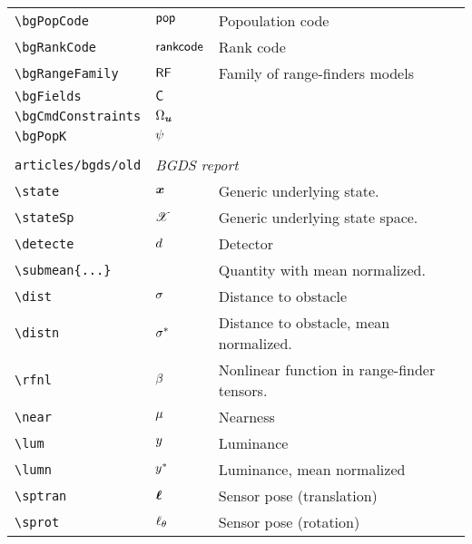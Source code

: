 \begin{longtable}{lll}
 {\color[rgb]{0.5,0.5,0.5}\texttt{\textbackslash bgPopCode}} & $\mathsf{pop}$ &  Popoulation code\\ 
 {\color[rgb]{0.5,0.5,0.5}\texttt{\textbackslash bgRankCode}} & $\mathsf{rankcode}$ &  Rank code\\ 
 {\color[rgb]{0.5,0.5,0.5}\texttt{\textbackslash bgRangeFamily}} & $\mathsf{RF}$ &  Family of range-finders models\\ 
 {\color[rgb]{0.5,0.5,0.5}\texttt{\textbackslash bgFields}} & ${\mathsf{C}}$ & \\ 
 {\color[rgb]{0.5,0.5,0.5}\texttt{\textbackslash bgCmdConstraints}} & ${\Omega}_{\boldsymbol{u}}$ & \\ 
 {\color[rgb]{0.5,0.5,0.5}\texttt{\textbackslash bgPopK}} & $\psi$ & \\ 
  &  & \\ 
 {\color[rgb]{0.5,0.5,0.5}\texttt{articles/bgds/old}} & \multicolumn{2}{l}{\emph{BGDS report}}\\ 
 \hline
{\color[rgb]{0.5,0.5,0.5}\texttt{\textbackslash state}} & $\boldsymbol{x}$ &  Generic underlying state.\\ 
 {\color[rgb]{0.5,0.5,0.5}\texttt{\textbackslash stateSp}} & $\mathscr{X}$ &  Generic underlying state space.\\ 
 {\color[rgb]{0.5,0.5,0.5}\texttt{\textbackslash detecte}} & $d$ &  Detector\\ 
 {\color[rgb]{0.5,0.5,0.5}\texttt{\textbackslash submean\{...\}}} &  &  Quantity with mean normalized.\\ 
 {\color[rgb]{0.5,0.5,0.5}\texttt{\textbackslash dist}} & $\sigma$ &  Distance to obstacle\\ 
 {\color[rgb]{0.5,0.5,0.5}\texttt{\textbackslash distn}} & ${\sigma}^{*}$ &  Distance to obstacle, mean normalized.\\ 
 {\color[rgb]{0.5,0.5,0.5}\texttt{\textbackslash rfnl}} & $\beta$ &  Nonlinear function in range-finder tensors.\\ 
 {\color[rgb]{0.5,0.5,0.5}\texttt{\textbackslash near}} & $\mu$ &  Nearness\\ 
 {\color[rgb]{0.5,0.5,0.5}\texttt{\textbackslash lum}} & $y$ &  Luminance\\ 
 {\color[rgb]{0.5,0.5,0.5}\texttt{\textbackslash lumn}} & ${y}^{*}$ &  Luminance, mean normalized\\ 
 {\color[rgb]{0.5,0.5,0.5}\texttt{\textbackslash sptran}} & $\boldsymbol{\ell}$ &  Sensor pose (translation)\\ 
 {\color[rgb]{0.5,0.5,0.5}\texttt{\textbackslash sprot}} & $\ell_{\theta}$ &  Sensor pose (rotation)\\ 

\end{longtable}
